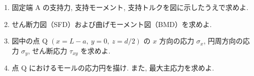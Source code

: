 \begin{enumerate}[label=(\arabic*)]
  \item 固定端 A の支持力, 支持モーメント, 支持トルクを図に示したうえで求めよ.

  \item せん断力図（SFD）および曲げモーメント図（BMD）を求めよ.

  \item 図中の点 Q $(x=L-a,\ y=0,\ z=d/2)$ の $x$ 方向の応力 $\sigma_x$,
        円周方向の応力 $\sigma_y$, せん断応力 $\tau_{xy}$ を求めよ.

  \item 点 Q におけるモールの応力円を描け. また, 最大主応力を求めよ.
\end{enumerate}
